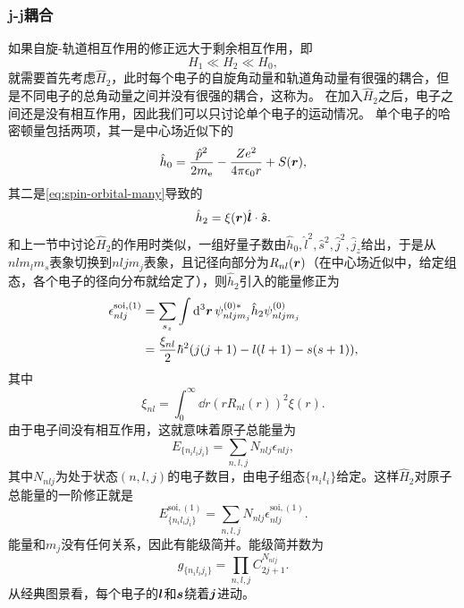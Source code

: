 \subsubsection{j-j耦合}\label{sec:jj-coupling}

如果自旋-轨道相互作用的修正远大于剩余相互作用，即
\begin{equation}
    H_1 \ll H_2 \ll H_0,
\end{equation}
就需要首先考虑$\hat{H}_2$，此时每个电子的自旋角动量和轨道角动量有很强的耦合，但是不同电子的总角动量之间并没有很强的耦合，这称为。
在加入$\hat{H}_2$之后，电子之间还是没有相互作用，因此我们可以只讨论单个电子的运动情况。
单个电子的哈密顿量包括两项，其一是中心场近似下的
\[
    \hat{h}_0 = \frac{\hat{p}^2}{2m_\text{e}} - \frac{Z e^2}{4\pi \epsilon_0 r} + S(\vb*{r}),
\]
其二是\eqref{eq:spin-orbital-many}导致的
\[
    \hat{h}_2 = \xi(\vb*{r}) \hat{\vb*{l}} \cdot \hat{\vb*{s}}.
\]
和上一节中讨论$\hat{H}_2$的作用时类似，一组好量子数由$\hat{h}_0, \hat{l}^2, \hat{s}^2, \hat{j}^2, \hat{j}_z$给出，于是从$nl m_l m_s$表象切换到$nlj m_j$表象，且记径向部分为$R_{nl}(\vb*{r})$（在中心场近似中，给定组态，各个电子的径向分布就给定了），则$\hat{h}_2$引入的能量修正为
\begin{equation}
    \begin{aligned}
        \epsilon_{nlj}^{\text{soi}, (1)} &= \sum_{s_z} \int \dd[3]{\vb*{r}} \psi^{(0)*}_{nlj m_j} \hat{h}_2 \psi^{(0)}_{nlj m_j} \\
        &= \frac{\xi_{nl}}{2} \hbar^2 (j(j+1) - l(l+1) - s(s+1)),
    \end{aligned}
\end{equation}
其中
\begin{equation}
    \xi_{nl} = \int_0^\infty \dd{r} (r R_{nl}(r))^2 \xi(r).
\end{equation}
由于电子间没有相互作用，这就意味着原子总能量为
\[
    E_{\{n_i l_i j_i\}} = \sum_{n, l, j} N_{nlj} \epsilon_{nlj},
\]
其中$N_{nlj}$为处于状态$(n, l, j)$的电子数目，由电子组态$\{n_i l_i\}$给定。这样$\hat{H}_2$对原子总能量的一阶修正就是
\begin{equation}
    E^{\text{soi}, (1)}_{\{n_i l_i j_i\}} = \sum_{n, l, j} N_{nlj} \epsilon_{nlj}^{\text{soi}, (1)}.
\end{equation}
能量和$m_j$没有任何关系，因此有能级简并。能级简并数为
\begin{equation}
    g_{\{n_i l_i j_i\}} = \prod_{n, l, j} C_{2j+1}^{N_{nlj}}.
\end{equation}
从经典图景看，每个电子的$\vb*{l}$和$\vb*{s}$绕着$\vb*{j}$进动。

